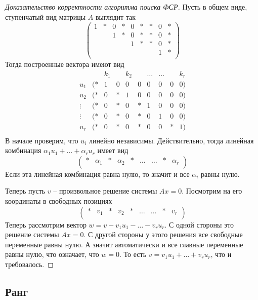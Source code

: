 \begin{proof}[Доказательство корректности алгоритма поиска ФСР]

Пусть в общем виде, ступенчатый вид матрицы $A$ выглядит так
\[
\begin{pmatrix}
{1}&{*}&{0}&{*}&{0}&{*}&{*}&{0}&{*}\\
{}&{}&{1}&{*}&{0}&{*}&{*}&{0}&{*}\\
{}&{}&{}&{}&{1}&{*}&{*}&{0}&{*}\\
{}&{}&{}&{}&{}&{}&{}&{1}&{*}\\
\end{pmatrix}
\]
Тогда построенные вектора имеют вид
\[
\begin{matrix}
{}&{}&{k_1}&{}&{k_2}&{}&{\ldots}&{\ldots}&{}&{k_r}\\
{u_1 }&{(*}&{1}&{0}&{0}&{0}&{0}&{0}&{0}&{0)}\\
{u_2}&{(*}&{0}&{*}&{1}&{0}&{0}&{0}&{0}&{0)}\\
{\vdots}&{(*}&{0}&{*}&{0}&{*}&{1}&{0}&{0}&{0)}\\
{\vdots}&{(*}&{0}&{*}&{0}&{*}&{0}&{1}&{0}&{0)}\\
{u_r}&{(*}&{0}&{*}&{0}&{*}&{0}&{0}&{*}&{1)}\\
\end{matrix}
\]
В начале проверим, что $u_i$ линейно независимы.
Действительно, тогда линейная комбинация $\alpha_1 u_1 +\ldots + \alpha_r u_r$ имеет вид
\[
\begin{pmatrix}
{*}&{\alpha_1}&{*}&{\alpha_2}&{*}&{\ldots}&{\ldots}&{*}&{\alpha_r}\\
\end{pmatrix}
\]
Если эта линейная комбинация равна нулю, то значит и все $\alpha_i$ равны нулю.

Теперь пусть $v$ -- произвольное решение системы $Ax = 0$.
Посмотрим на его координаты в свободных позициях
\[
\begin{pmatrix}
{*}&{v_1}&{*}&{v_2}&{*}&{\ldots}&{\ldots}&{*}&{v_r}\\
\end{pmatrix}
\]
Теперь рассмотрим вектор $w = v - v_1 u_1 - \ldots - v_r u_r$.
С одной стороны это решение системы $Ax = 0$.
С другой стороны у этого решения все свободные переменные равны нулю.
А значит автоматически и все главные переменные равны нулю, что означает, что $w  = 0$.
То есть $v = v_1 u_1 + \ldots + v_r u_r$, что и требовалось.
\end{proof}


\subsection{Ранг}

